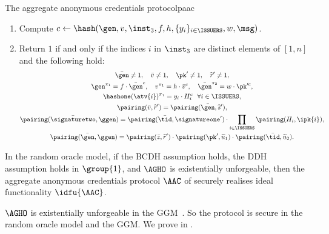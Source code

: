 \begin{protocolbox}{The aggregate anonymous credentials protocol}{paac}
\begin{description}
    \begin{enumerate}

      \item Compute $c \leftarrow \hash(\gen, v, \inst_3, f, h, \{y_i\}_{i \in
\ISSUERS}, w, \msg)$.

      \item Return $1$ if and only if the indices $i$ in $\inst_3$ are distinct
elements of $[1,n]$ and the following hold:
	\begin{gather*}
	  \bar{\gen} \neq 1, \quad \bar{v} \neq 1, \quad \pk' \neq 1, \quad
\widetilde{r}' \neq 1, \\
	   \gen^{\pi_1} = f\cdot\bar{\gen}^c, \quad v^{\pi_1}
= h\cdot\bar{v}^c, \quad \bar{\gen}^{\pi_2} = w\cdot\pk'^c, \\
	  \hashone(\atv{i})^{\pi_1} = y_i\cdot H_i^c \ \ \forall i \in \ISSUERS,
\\
	  \pairing(\bar{v}, \widetilde{r}')= \pairing(\bar{\gen},
\widetilde{s}'), \\
	  \pairing(\bar{\signaturetwo}, \ggen) = \pairing(\bar{\tid},
\signatureone') \cdot \prod_{i\in \ISSUERS}\pairing(H_i, \ipk{i}), \\
	  \pairing(\bar{\gen}, \ggen) = \pairing(\bar{z},
\widetilde{r}')\cdot \pairing(\pk', \widetilde{u}_1)\cdot \pairing(\bar{\tid},
\widetilde{u}_2).
	\end{gather*}
    \end{enumerate}

\end{description}

\end{protocolbox}

\begin{theorem}\label{thm:agg-creds-thm-2}

    In the random oracle model, if the BCDH assumption holds, the DDH assumption
holds in $\group{1}$, and $\AGHO$ is existentially unforgeable, then the
aggregate anonymous credentials protocol $\AAC$ of  securely
realises ideal functionality $\idfu{\AAC}$.

\end{theorem}

$\AGHO$ is existentially unforgeable in the GGM~\cite{C:AGHO11}. So the
protocol is secure in the random oracle model and the GGM. We prove  in .


